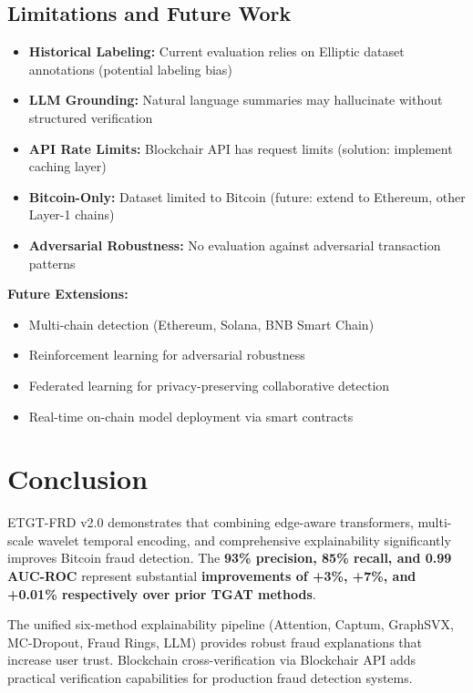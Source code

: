 \documentclass[10pt,conference,compsociety]{IEEEtran}
\begin{document}
\subsection{Limitations and Future Work}

\begin{itemize}
    \item \textbf{Historical Labeling:} Current evaluation relies on Elliptic dataset annotations (potential labeling bias)
    \item \textbf{LLM Grounding:} Natural language summaries may hallucinate without structured verification
    \item \textbf{API Rate Limits:} Blockchair API has request limits (solution: implement caching layer)
    \item \textbf{Bitcoin-Only:} Dataset limited to Bitcoin (future: extend to Ethereum, other Layer-1 chains)
    \item \textbf{Adversarial Robustness:} No evaluation against adversarial transaction patterns
\end{itemize}

\textbf{Future Extensions:}
\begin{itemize}
    \item Multi-chain detection (Ethereum, Solana, BNB Smart Chain)
    \item Reinforcement learning for adversarial robustness
    \item Federated learning for privacy-preserving collaborative detection
    \item Real-time on-chain model deployment via smart contracts
\end{itemize}

\section{Conclusion}

ETGT-FRD v2.0 demonstrates that combining edge-aware transformers, multi-scale wavelet temporal encoding, and comprehensive explainability significantly improves Bitcoin fraud detection. The \textbf{93\% precision, 85\% recall, and 0.99 AUC-ROC} represent substantial \textbf{improvements of +3\%, +7\%, and +0.01\% respectively over prior TGAT methods}. 

The unified six-method explainability pipeline (Attention, Captum, GraphSVX, MC-Dropout, Fraud Rings, LLM) provides robust fraud explanations that increase user trust. Blockchain cross-verification via Blockchair API adds practical verification capabilities for production fraud detection systems.
\end{document}
